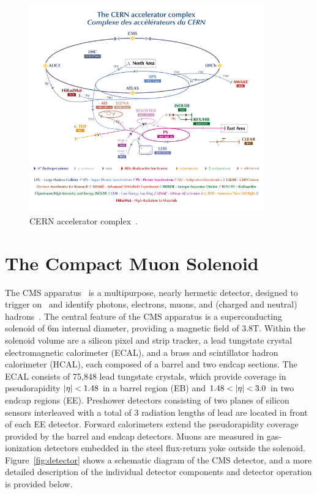 \begin{figure}[tb]
  \centering
   \includegraphics[width=0.9\textwidth]{fig/experiment/CCC-v2019-final-white.png}
	\caption[CERN accelerator complex.]{CERN accelerator complex~\cite{CERN_complex}.}
	\label{fig:accelerator_complex}
\end{figure}


\section{The Compact Muon Solenoid}
The CMS apparatus~\cite{CMS:2008xjf} is a multipurpose, nearly hermetic detector, designed to trigger on~\cite{CMS:2020cmk,CMS:2016ngn} and identify photons, electrons, muons, and (charged and neutral) hadrons~\cite{CMS:2015myp,CMS:2015xaf,CMS:2018rym,CMS:2014pgm}.
The central feature of the CMS apparatus is a superconducting solenoid of 6\unit{m} internal diameter, providing a magnetic field of $3.8$\unit{T}. Within the solenoid volume are a silicon pixel and strip tracker, a lead tungstate crystal electromagnetic calorimeter (ECAL), and a brass and scintillator hadron calorimeter (HCAL), each composed of a barrel and two endcap sections. The ECAL consists of 75,848 lead tungstate crystals, which provide coverage in pseudorapidity $\lvert \eta \rvert < 1.48 $ in a barrel region (EB) and $1.48 < \lvert \eta \rvert < 3.0$ in two endcap regions (EE). Preshower detectors consisting of two planes of silicon sensors interleaved with a total of $3$ radiation lengths of lead are located in front of each EE detector. Forward calorimeters extend the pseudorapidity coverage provided by the barrel and endcap detectors. Muons are measured in gas-ionization detectors embedded in the steel flux-return yoke outside the solenoid. Figure~\ref{fig:detector} shows a schematic diagram of the CMS detector, and a more detailed description of the individual detector components and detector operation is provided below. 

